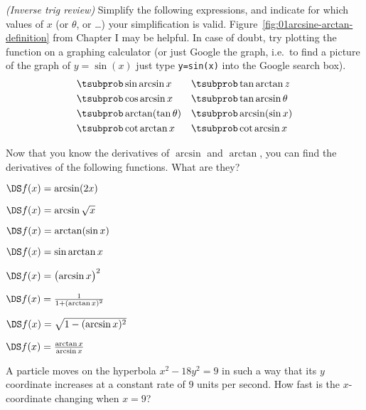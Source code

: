 \begin{multicols}{2}
\problem \groupproblem \textit{(Inverse trig review)}
Simplify the following expressions, and indicate for which values of
$x$ (or $\theta$, or \ldots) your simplification is valid.
Figure~\ref{fig:01arcsine-arctan-definition} from Chapter I may be
helpful.  In case of doubt, try plotting the function on a graphing
calculator (or just Google the graph, i.e.~to find a picture of the
graph of $y=\sin(x)$ just type \verb|y=sin(x)| into the Google
search box).
\begin{align*}
  \tsubprob &\sin \arcsin x  &\tsubprob &  \tan\arctan z \\
  \tsubprob &\cos \arcsin x  &\tsubprob & \tan \arcsin \theta \\
  \tsubprob &\arctan(\tan \theta) &\tsubprob & \arcsin(\sin x) \\
  \tsubprob &\cot \arctan x &\tsubprob & \cot\arcsin x
\end{align*}

Now that you know the derivatives of $\arcsin$ and $\arctan$, you can find
the derivatives of the following functions.  What are they?

\problem $\DS f(x) = \arcsin(2x)$

\problem $\DS f(x) = \arcsin\sqrt x $

\problem $\DS f(x) = \arctan(\sin x)$

\problem $\DS f(x) = \sin\arctan x $

\problem $\DS f(x) = \bigl(\arcsin x\bigr)^2 $

\problem $\DS f(x) = \frac{1}{1+(\arctan x)^2} $

\problem $\DS f(x) = \sqrt{1-(\arcsin x)^2}$

\problem $\DS f(x) = \frac{\arctan x}{\arcsin x}$
\end{multicols}

\problem A particle moves on the hyperbola $x^2-18 y^2=9$ in such a way
that its $y$ coordinate increases at a constant rate of $9$ units per
second. How fast is the $x$-coordinate changing when $x = 9$?

